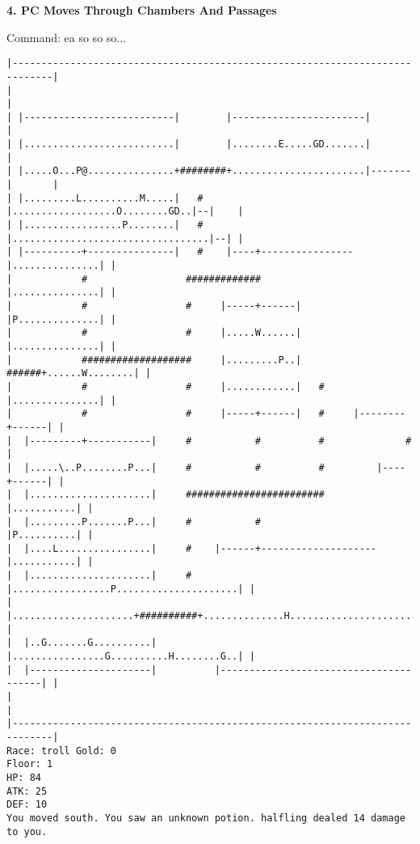 \documentclass[11pt]{article}
\theoremstyle{plain}
\begin{document}
\newpage
\textbf{4. PC Moves Through Chambers And Passages}

Command: ea so so so...
\begin{Verbatim}[fontsize=\scriptsize]
|-----------------------------------------------------------------------------|
|                                                                             |
| |--------------------------|        |-----------------------|               |
| |..........................|        |........E.....GD.......|               |
| |.....O...P@...............+########+.......................|-------|       |
| |.........L..........M.....|   #    |..................O........GD..|--|    |
| |.................P........|   #    |..................................|--| |
| |----------+---------------|   #    |----+----------------|...............| |
|            #                 #############                |...............| |
|            #                 #     |-----+------|         |P..............| |
|            #                 #     |.....W......|         |...............| |
|            ###################     |.........P..|   ######+......W........| |
|            #                 #     |............|   #     |...............| |
|            #                 #     |-----+------|   #     |--------+------| |
|  |---------+-----------|     #           #          #              #        |
|  |.....\..P........P...|     #           #          #         |----+------| |
|  |.....................|     ########################         |...........| |
|  |.........P.......P...|     #           #                    |P..........| |
|  |....L................|     #    |------+--------------------|...........| |
|  |.....................|     #    |.................P.....................| |
|  |.....................+##########+..............H........................| |
|  |..G.......G..........|          |................G..........H........G..| |
|  |---------------------|          |---------------------------------------| |
|                                                                             |
|-----------------------------------------------------------------------------|
Race: troll Gold: 0                                                    Floor: 1
HP: 84
ATK: 25
DEF: 10
You moved south. You saw an unknown potion. halfling dealed 14 damage to you. 
\end{Verbatim}
\end{document}
